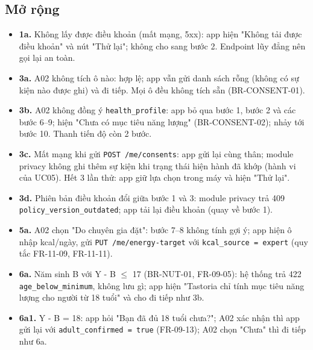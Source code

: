 \subsection{Mở rộng}
\begin{itemize}
\item \textbf{1a.} Không lấy được điều khoản (mất mạng, 5xx): app hiện "Không tải được điều khoản" và nút "Thử lại"; không cho sang bước 2. Endpoint lũy đẳng nên gọi lại an toàn.
\item \textbf{3a.} A02 không tích ô nào: hợp lệ; app vẫn gửi danh sách rỗng (không có sự kiện nào được ghi) và đi tiếp. Mọi ô đều không tích sẵn (BR-\allowbreak{}CONSENT-\allowbreak{}01).
\item \textbf{3b.} A02 không đồng ý {\small\texttt{health\_\allowbreak{}\allowbreak{}profile}}: app bỏ qua bước 1, bước 2 và các bước 6--9; hiện "Chưa có mục tiêu năng lượng" (BR-\allowbreak{}CONSENT-\allowbreak{}02); nhảy tới bước 10. Thanh tiến độ còn 2 bước.
\item \textbf{3c.} Mất mạng khi gửi {\small\texttt{POST /\allowbreak{}\allowbreak{}me/\allowbreak{}\allowbreak{}consents}}: app gửi lại cùng thân; module privacy không ghi thêm sự kiện khi trạng thái hiện hành đã khớp (hành vi của UC05). Hết 3 lần thử: app giữ lựa chọn trong máy và hiện "Thử lại".
\item \textbf{3d.} Phiên bản điều khoản đổi giữa bước 1 và 3: module privacy trả 409 {\small\texttt{policy\_\allowbreak{}\allowbreak{}version\_\allowbreak{}\allowbreak{}outdated}}; app tải lại điều khoản (quay về bước 1).
\item \textbf{5a.} A02 chọn "Do chuyên gia đặt": bước 7--8 không tính gợi ý; app hiện ô nhập kcal/\allowbreak{}ngày, gửi {\small\texttt{PUT /\allowbreak{}\allowbreak{}me/\allowbreak{}\allowbreak{}energy-\allowbreak{}target}} với {\small\texttt{kcal\_\allowbreak{}\allowbreak{}source = expert}} (quy tắc FR-\allowbreak{}11-\allowbreak{}09, FR-\allowbreak{}11-\allowbreak{}11).
\item \textbf{6a.} Năm sinh B với Y - B \ensuremath{\leq} 17 (BR-\allowbreak{}NUT-\allowbreak{}01, FR-\allowbreak{}09-\allowbreak{}05): hệ thống trả 422 {\small\texttt{age\_\allowbreak{}\allowbreak{}below\_\allowbreak{}\allowbreak{}minimum}}, không lưu gì; app hiện "Tastoria chỉ tính mục tiêu năng lượng cho người từ 18 tuổi" và cho đi tiếp như 3b.
\item \textbf{6a1.} Y - B = 18: app hỏi "Bạn đã đủ 18 tuổi chưa?"; A02 xác nhận thì app gửi lại với {\small\texttt{adult\_\allowbreak{}\allowbreak{}confirmed = true}} (FR-\allowbreak{}09-\allowbreak{}13); A02 chọn "Chưa" thì đi tiếp như 6a.

\end{itemize}
